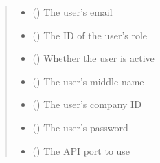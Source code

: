 \documentclass[letterpaper,10pt,english]{sphinxmanual}
\begin{document}
\begin{fulllineitems}
\begin{fulllineitems}
\begin{quote}
\begin{description}
\begin{itemize}
\item {} 
\sphinxAtStartPar
{} () \textendash{} The user’s email

\item {} 
\sphinxAtStartPar
{} () \textendash{} The ID of the user’s role

\item {} 
\sphinxAtStartPar
{} (\sphinxstyleliteralemphasis{\sphinxupquote{ (}}\sphinxstyleliteralemphasis{\sphinxupquote{)}}) \textendash{} Whether the user is active

\item {} 
\sphinxAtStartPar
{} (\sphinxstyleliteralemphasis{\sphinxupquote{ (}}\sphinxstyleliteralemphasis{\sphinxupquote{)}}) \textendash{} The user’s middle name

\item {} 
\sphinxAtStartPar
{} (\sphinxstyleliteralemphasis{\sphinxupquote{ (}}\sphinxstyleliteralemphasis{\sphinxupquote{)}}) \textendash{} The user’s company ID

\item {} 
\sphinxAtStartPar
{} (\sphinxstyleliteralemphasis{\sphinxupquote{ (}}\sphinxstyleliteralemphasis{\sphinxupquote{)}}) \textendash{} The user’s password

\item {} 
\sphinxAtStartPar
{} (\sphinxstyleliteralemphasis{\sphinxupquote{ (}}\sphinxstyleliteralemphasis{\sphinxupquote{)}}) \textendash{} The API port to use


\end{itemize}
\end{description}
\end{quote}
\end{fulllineitems}
\end{fulllineitems}
\end{document}
